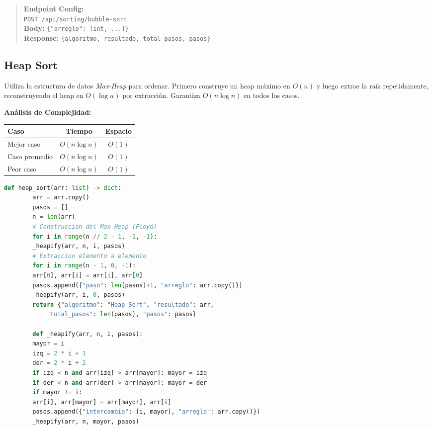 \documentclass[12pt, letterpaper]{article}
\begin{document}
	\begin{quote}
		\textbf{Endpoint Config:} \\
		\texttt{POST /api/sorting/bubble-sort} \\
		\textbf{Body:} \texttt{\{"arreglo": [int, ...]\}} \\
		\textbf{Response:} \texttt{\{algoritmo, resultado, total\_pasos, pasos\}}
	\end{quote}
	
	\subsection{Heap Sort}
	Utiliza la estructura de datos \textit{Max-Heap} para ordenar. Primero construye un heap máximo en $O(n)$ y luego extrae la raíz repetidamente, reconstruyendo el heap en $O(\log n)$ por extracción. Garantiza $O(n \log n)$ en todos los casos.
	
	\textbf{Análisis de Complejidad:}
	\begin{table}[h]
		\centering
		\begin{tabular}{@{}lcc@{}}
			\toprule
			\textbf{Caso} & \textbf{Tiempo} & \textbf{Espacio} \\ \midrule
			Mejor caso    & $O(n \log n)$   & $O(1)$ \\
			Caso promedio & $O(n \log n)$   & $O(1)$ \\
			Peor caso     & $O(n \log n)$   & $O(1)$ \\ \bottomrule
		\end{tabular}
	\end{table}
	
	\begin{lstlisting}[language=Python, caption={Implementacion de Heap Sort}]
		def heap_sort(arr: list) -> dict:
		arr = arr.copy()
		pasos = []
		n = len(arr)
		# Construccion del Max-Heap (Floyd)
		for i in range(n // 2 - 1, -1, -1):
		_heapify(arr, n, i, pasos)
		# Extraccion elemento a elemento
		for i in range(n - 1, 0, -1):
		arr[0], arr[i] = arr[i], arr[0]
		pasos.append({"paso": len(pasos)+1, "arreglo": arr.copy()})
		_heapify(arr, i, 0, pasos)
		return {"algoritmo": "Heap Sort", "resultado": arr,
			"total_pasos": len(pasos), "pasos": pasos}
		
		def _heapify(arr, n, i, pasos):
		mayor = i
		izq = 2 * i + 1
		der = 2 * i + 2
		if izq < n and arr[izq] > arr[mayor]: mayor = izq
		if der < n and arr[der] > arr[mayor]: mayor = der
		if mayor != i:
		arr[i], arr[mayor] = arr[mayor], arr[i]
		pasos.append({"intercambio": [i, mayor], "arreglo": arr.copy()})
		_heapify(arr, n, mayor, pasos)
	\end{lstlisting}
	
\end{document}
